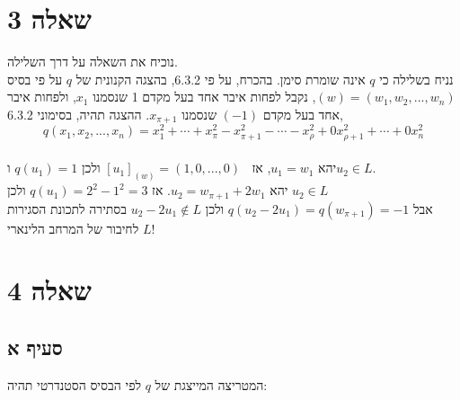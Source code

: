 \documentclass{article}
\DeclareMathOperator{\tra}{^t}
\begin{document}
\section*{שאלה 3}

נוכיח את השאלה על דרך השלילה. \\
נניח בשלילה כי $q$ אינה שומרת סימן.
בהכרח, על פי 6.3.2, בהצגה הקנונית של $q$ על פי בסיס $(w)=(w_1, w_2, ..., w_n)$, נקבל לפחות איבר אחד בעל מקדם 1 שנסמנו $x_1$, ולפחות איבר אחד בעל מקדם $(-1)$ שנסמנו $x_{\pi +1}$. ההצגה תהיה, בסימוני 6.3.2,
\[
    q(x_1, x_2, ..., x_n)=x_1^2+\cdots+x_{\pi}^2-x_{\pi+1}^2-\cdots-x_{\rho}^2+0x_{\rho+1}^2+\cdots+0x_n^2
\]
\\
יהא $u_1=w_1$, אז $[u_1]_{(w)}=(1, 0, ..., 0)\tra$ ולכן $q(u_1)=1$ ו$u_2\in L$. \\
יהא $u_2=w_{\pi+1}+2w_1$. אז $q(u_1)=2^2-1^2=3$ ולכן $u_2\in L$ \\
אבל $q(u_2-2u_1)=q(w_{\pi+1})=-1$ ולכן $u_2-2u_1\notin L$ בסתירה לתכונת הסגירות לחיבור של המרחב הלינארי $L$!

\pagebreak

\section*{שאלה 4}

\subsection*{סעיף א}

המטריצה המייצגת של $q$ לפי הבסיס הסטנדרטי תהיה:
\end{document}
